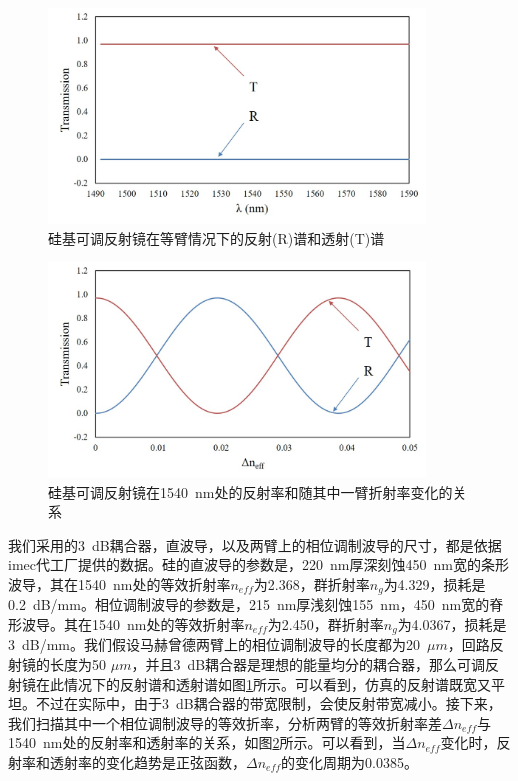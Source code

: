 \begin{figure}[htb]
	\centering
	\includegraphics[width=10cm]{./Pictures/chapt5_tunable_reflection_mirror_spec.jpg}
	\caption{硅基可调反射镜在等臂情况下的反射(R)谱和透射(T)谱}
	\label{chapt5_tunable_reflection_mirror_spec}
\end{figure}
\begin{figure}[htb]
	\centering
	\includegraphics[width=10cm]{./Pictures/chapt5_tunable_reflection_mirror_spec_single.jpg}
	\caption{硅基可调反射镜在1540~nm处的反射率和随其中一臂折射率变化的关系}
	\label{chapt5_tunable_reflection_mirror_spec_single}
\end{figure}
我们采用的3~dB耦合器，直波导，以及两臂上的相位调制波导的尺寸，都是依据imec代工厂提供的数据\cite{Imec}。硅的直波导的参数是，220~nm厚深刻蚀450~nm宽的条形波导，其在1540~nm处的等效折射率$n_{eff}$为2.368，群折射率$n_{g}$为4.329，损耗是0.2~dB/mm。相位调制波导的参数是，215~nm厚浅刻蚀155~nm，450~nm宽的脊形波导。其在1540~nm处的等效折射率$n_{eff}$为2.450，群折射率$n_{g}$为4.0367，损耗是3~dB/mm。我们假设马赫曾德两臂上的相位调制波导的长度都为20~$\mu m$，回路反射镜的长度为50 $\mu m$，并且3~dB耦合器是理想的能量均分的耦合器，那么可调反射镜在此情况下的反射谱和透射谱如图\ref{chapt5_tunable_reflection_mirror_spec}所示。可以看到，仿真的反射谱既宽又平坦。不过在实际中，由于3~dB耦合器的带宽限制，会使反射带宽减小。接下来，我们扫描其中一个相位调制波导的等效折率，分析两臂的等效折射率差$\Delta n_{eff}$与1540~nm处的反射率和透射率的关系，如图\ref{chapt5_tunable_reflection_mirror_spec_single}所示。可以看到，当$\Delta n_{eff}$变化时，反射率和透射率的变化趋势是正弦函数，$\Delta n_{eff}$的变化周期为0.0385。

